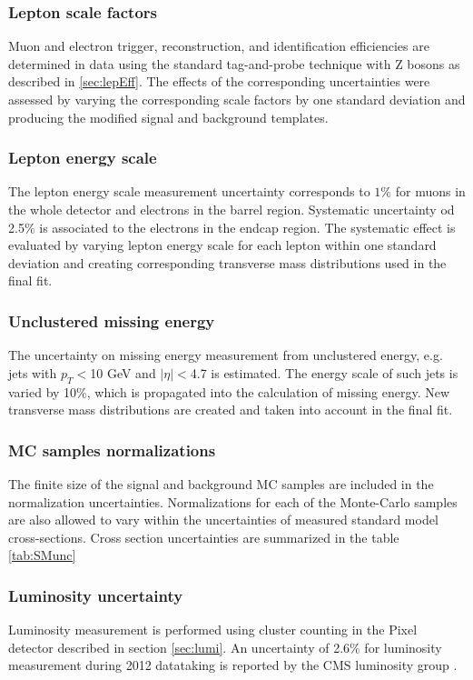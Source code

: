 \subsubsection*{Lepton scale factors}
        Muon and electron trigger, reconstruction, and identification efficiencies are determined in data using the standard tag-and-probe technique with Z bosons as described in \ref{sec:lepEff}. The effects of the corresponding uncertainties were assessed by varying the corresponding scale factors by one standard deviation and producing the modified signal and background templates. 
\subsubsection*{Lepton energy scale} 
		The lepton energy scale measurement uncertainty corresponds to $1\%$ for muons in the whole detector and electrons in the barrel region. Systematic uncertainty od 2.5$\%$ is associated to the electrons in the endcap region. The systematic effect is evaluated by varying lepton energy scale for each lepton within one standard deviation and creating corresponding transverse mass distributions used in the final fit.
\subsubsection*{Unclustered missing energy}
        The uncertainty on missing energy measurement from unclustered energy, e.g. jets with $p_T<$10 GeV and $|\eta|<$4.7 is estimated. The energy scale of such jets is varied by 10$\%$, which is propagated into the calculation of missing energy. New transverse mass distributions are created and taken into account in the final fit.
\subsubsection*{MC samples normalizations}
        The finite size of the signal and background MC samples are included in the normalization uncertainties. Normalizations for each of the Monte-Carlo samples are also allowed to vary within the uncertainties of measured standard model cross-sections. Cross section uncertainties are summarized in the table \ref{tab:SMunc}
\subsubsection*{Luminosity uncertainty}
        Luminosity measurement is performed using cluster counting in the Pixel detector described in section \ref{sec:lumi}. An uncertainty of 2.6$\%$ for luminosity measurement during 2012 datataking is reported by the CMS luminosity group \cite{CMS-PAS-LUM-13-001}.

